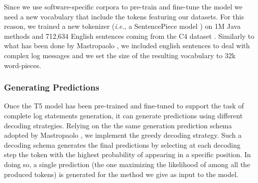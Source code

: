 Since we use software-specific corpora to pre-train and fine-tune the model we need a new vocabulary that include the \java tokens featuring our datasets. For this reason, we trained a new tokenizer (\emph{i.e.}, a SentencePiece model \cite{kudo2018sentencepiece}) on 1M Java methods and 712,634 English sentences coming from the C4 dataset \cite{raffel2019exploring}. Similarly to what has been done by Mastropaolo \etal \cite{mastropaolo2022using}, we included english sentences to deal with complex log messages and we set the size of the resulting vocabulary to 32k word-pieces.


\subsubsection{Generating Predictions}
Once the T5 model has been pre-trained and fine-tuned to support the task of complete log statements generation, it can generate predictions using different decoding strategies. Relying on the the same generation prediction schema adopted by Mastropaolo \etal \cite{mastropaolo2022using}, we implement the greedy decoding strategy. Such a decoding schema generates the final predictions by selecting at each decoding step the token with the highest probability of appearing in a specific position. In doing so, a single prediction (\ie the one maximizing the likelihood of among all the produced tokens) is generated for the method we give as input to the model.




